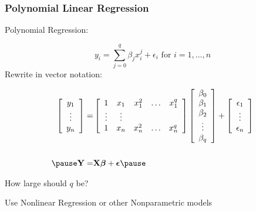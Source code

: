 \documentclass[handout]{beamer}\usepackage[]{graphicx}\usepackage[]{color}
\begin{document}
\begin{frame} \frametitle{Polynomial Linear Regression}
Polynomial  Regression:

$$y_i = \sum_{j = 0}^q \beta_j x_i^j + \epsilon_i \text{  for  } i = 1, \ldots, n$$
\pause
Rewrite in vector  notation:

\begin{eqnarray*}
\left[
\begin{array}{c}  y_1 \\ \vdots \\  y_n \end{array}
  \right]   =  &
 \left[ \begin{array}{ccccc}  1 &  x_1 & x_1^2 & \ldots & x^q_1  \\
     \vdots & \vdots \\ 1 & x_n & x_n^2 & \ldots & x_n^q\end{array}  \right]
 \left[ \begin{array}{c}  \beta_0  \\  \beta_1 \\ \beta_2 \\ \vdots \\ \beta_q \end{array}
 \right] +
\left[ \begin{array}{c}  \epsilon_1 \\ \vdots \\ \epsilon_n  \end{array}
\right] \\
 & \\ \pause
\Y = & \X \b + \eps \pause
\end{eqnarray*}

How large should $q$ be?    \pause

Use Nonlinear Regression  or other Nonparametric models

\end{frame}
\end{document}
